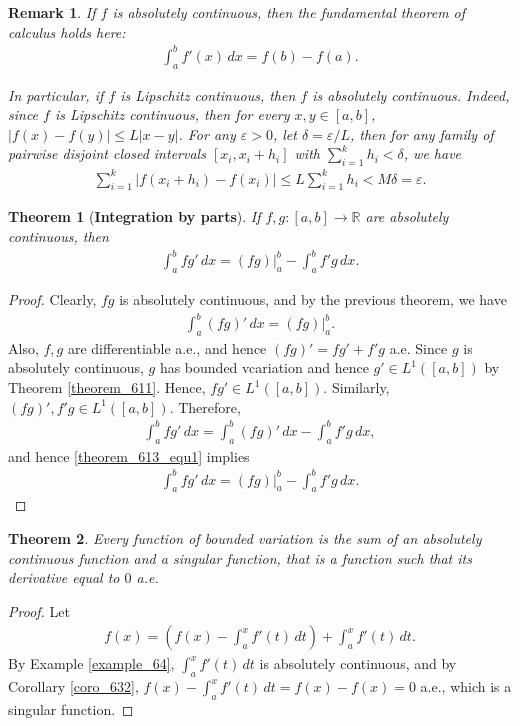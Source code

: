 \documentclass[11pt]{book}
\newtheorem{theorem}{Theorem}[chapter]
\newtheorem{remark}{Remark}[chapter]
\theoremstyle{definition}
\numberwithin{equation}{chapter}
\begin{document}
\begin{remark}
If $f$ is absolutely continuous, then the fundamental theorem of calculus holds here:
\begin{align*}
    \int^b_a f'(x)\,dx = f(b) - f(a).
\end{align*}

In particular, if $f$ is Lipschitz continuous, then $f$ is absolutely continuous. Indeed, since $f$ is Lipschitz continuous, then for every $x,y \in [a,b]$, $\left|f(x) - f(y)\right| \leq L \left|x - y\right|$. For any $\varepsilon > 0$, let $\delta  = \varepsilon/L$, then for any family of pairwise disjoint closed intervals $[x_i,x_i+h_i]$ with $\sum^k_{i=1} h_i < \delta$, we have
\begin{align*}
    \sum^k_{i=1} \left|f(x_i+h_i) - f(x_i)\right| \leq L \sum^k_{i=1} h_i < M \delta = \varepsilon.
\end{align*}
\end{remark}

\medskip

\begin{theorem}[{\bf Integration by parts}]
If $f,g: [a,b] \to \mathbb{R}$ are absolutely continuous, then 
\begin{align*}
    \int^b_a fg'\,dx = (fg)\bigg|^b_a - \int^b_a f'g\,dx.
\end{align*}
\end{theorem}
\begin{proof}
Clearly, $fg$ is absolutely continuous, and by the previous theorem, we have
\begin{align}\label{theorem_613_equ1}
    \int^b_a (fg)'\,dx = (fg)\bigg|^b_a.
\end{align}
Also, $f,g$ are differentiable a.e., and hence $(fg)' = fg' + f'g$ a.e. Since $g$ is absolutely continuous, $g$ has bounded vcariation and hence $g' \in L^1([a,b])$ by Theorem \ref{theorem_611}. Hence, $fg' \in L^1([a,b])$. Similarly, $(fg)', f'g \in L^1([a,b])$. Therefore,
\begin{align*}
    \int^b_a fg'\,dx = \int^b_a (fg)'\,dx - \int^b_a f'g\,dx,
\end{align*}
and hence \eqref{theorem_613_equ1} implies 
\begin{align*}
    \int^b_a fg'\,dx = (fg)\bigg|^b_a - \int^b_a f'g\,dx.
\end{align*}
\end{proof}

\medskip

\begin{theorem}
Every function of bounded variation is the sum of an absolutely continuous function and a singular function, that is a function such that its derivative equal to $0$ a.e.
\end{theorem}
\begin{proof}
Let 
\begin{align*}
    f(x) = \left(f(x) - \int^x_a f'(t)\,dt\right) + \int^x_a f'(t)\,dt.
\end{align*}
By Example \ref{example_64}, $\int^x_a f'(t)\,dt$ is absolutely continuous, and by Corollary \ref{coro_632},
$f(x) - \int^x_a f'(t)\,dt = f(x) - f(x) = 0$ a.e., which is a singular function.
\end{proof}
\end{document}
